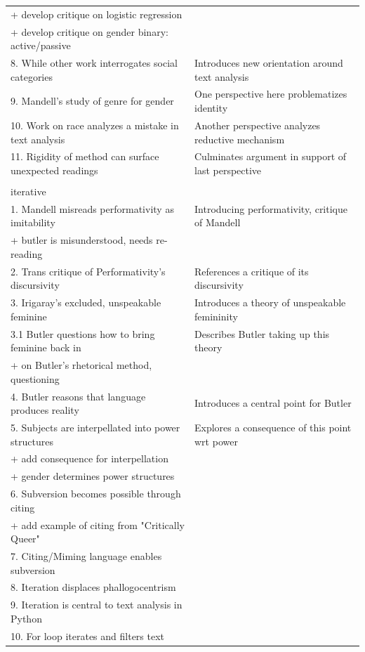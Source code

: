 \documentclass[11pt]{article}
\begin{document}
\begin{center}
\begin{tabular}{ll}
+ develop critique on logistic regression & \\[0pt]
+ develop critique on gender binary: active/passive & \\[0pt]
8. While other work interrogates social categories & Introduces new orientation around text analysis\\[0pt]
9. Mandell's study of genre for gender & One perspective here problematizes identity\\[0pt]
10. Work on race analyzes a mistake in text analysis & Another perspective analyzes reductive mechanism\\[0pt]
11. Rigidity of method can surface unexpected readings & Culminates argument in support of last perspective\\[0pt]
 & \\[0pt]
iterative & \\[0pt]
1. Mandell misreads performativity as imitability & Introducing performativity, critique of Mandell\\[0pt]
+ butler is misunderstood, needs re-reading & \\[0pt]
2. Trans critique of Performativity's discursivity & References a critique of its discursivity\\[0pt]
3. Irigaray's excluded, unspeakable feminine & Introduces a theory of unspeakable femininity\\[0pt]
3.1 Butler questions how to bring feminine back in & Describes Butler taking up this theory\\[0pt]
+ on Butler's rhetorical method, questioning & \\[0pt]
4. Butler reasons that language produces reality & Introduces a central point for Butler\\[0pt]
5. Subjects are interpellated into power structures & Explores a consequence of this point wrt power\\[0pt]
+ add consequence for interpellation & \\[0pt]
+ gender determines power structures & \\[0pt]
6. Subversion becomes possible through citing & \\[0pt]
+  add example of citing from "Critically Queer" & \\[0pt]
7. Citing/Miming language enables subversion & \\[0pt]
8. Iteration displaces phallogocentrism & \\[0pt]
9. Iteration is central to text analysis in Python & \\[0pt]
10. For loop iterates and filters text & \\[0pt]

\end{tabular}
\end{center}
\end{document}
